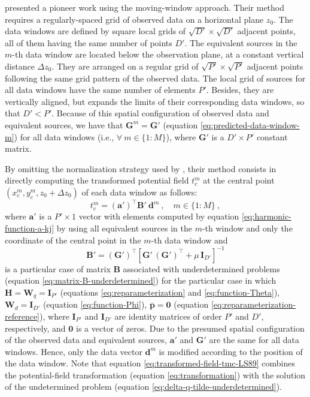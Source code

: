 \cite{leao-silva1989} presented a pioneer work using the moving-window approach.
Their method requires a regularly-spaced grid of observed data on a horizontal plane $z_{0}$. 
The data windows are defined by square local grids of $\sqrt{D'} \times \sqrt{D'}$ adjacent points, all of them having the
same number of points $D'$.
The equivalent sources in the $m$-th data window are located below the observation plane, at a constant vertical distance
$\Delta z_{0}$. They are arranged on a regular grid of $\sqrt{P'} \times \sqrt{P'}$ adjacent points 
following the same grid pattern of the observed data. 
The local grid of sources for all data windows have the same number of elements $P'$.
Besides, they are vertically aligned, but expands the limits of their corresponding data windows,
so that $D' < P'$.
Because of this spatial configuration of observed data and equivalent sources, we have that
$\mathbf{G}^{m} = \mathbf{G}'$ (equation \ref{eq:predicted-data-window-m}) for all data windows 
(i.e., $\forall \: m \in \{1 : M\}$), where $\mathbf{G}'$ is a $D' \times P'$ constant matrix.

By omitting the normalization strategy used by \cite{leao-silva1989}, their method consists in 
directly computing the transformed potential field $t^{m}_{c}$ at the central point $(x^{m}_{c}, y^{m}_{c}, z_{0} + \Delta z_{0})$ 
of each data window as follows:
\begin{equation}
	t^{m}_{c} = \left( \mathbf{a}' \right)^{\top} \mathbf{B}' \: \mathbf{d}^{m} \: , \quad m \in \{ 1 : M \} \: ,
	\label{eq:transformed-field-tmc-LS89}
\end{equation}
where $\mathbf{a}'$ is a $P' \times 1$ vector with elements computed by equation 
\ref{eq:harmonic-function-a-kj} by using all equivalent sources in the $m$-th window and
only the coordinate of the central point in the $m$-th data window and
\begin{equation}
	\mathbf{B}'  = \left( \mathbf{G}' \right)^{\top} 
	\left[ \mathbf{G}' \, \left( \mathbf{G}' \right)^{\top} + \mu \, \mathbf{I}_{D'} \right]^{-1} 
	\label{eq:dummy-matrix-LS89}
\end{equation}
is a particular case of matrix $\mathbf{B}$ associated with underdetermined problems (equation \ref{eq:matrix-B-underdetermined}) 
for the particular case in which $\mathbf{H} = \mathbf{W}_{q} = \mathbf{I}_{P'}$ (equations \ref{eq:reparameterization} and \ref{eq:function-Theta}),
$\mathbf{W}_{d} = \mathbf{I}_{D'}$ (equation \ref{eq:function-Phi}), $\bar{\mathbf{p}} = \mathbf{0}$ 
(equation \ref{eq:reparameterization-reference}), where $\mathbf{I}_{P'}$ and $\mathbf{I}_{D'}$ are identity matrices 
of order $P'$ and $D'$, respectively, and $\mathbf{0}$ is a vector of zeros. 
Due to the presumed spatial configuration of the observed 
data and equivalent sources, $\mathbf{a}'$ and $\mathbf{G}'$ are the same for all data windows.
Hence, only the data vector $\mathbf{d}^{m}$ is modified according to the position of the data window.
Note that equation \ref{eq:transformed-field-tmc-LS89} combines the potential-field transformation
(equation \ref{eq:transformation}) with the solution of the undetermined problem
(equation \ref{eq:delta-q-tilde-underdetermined}).

